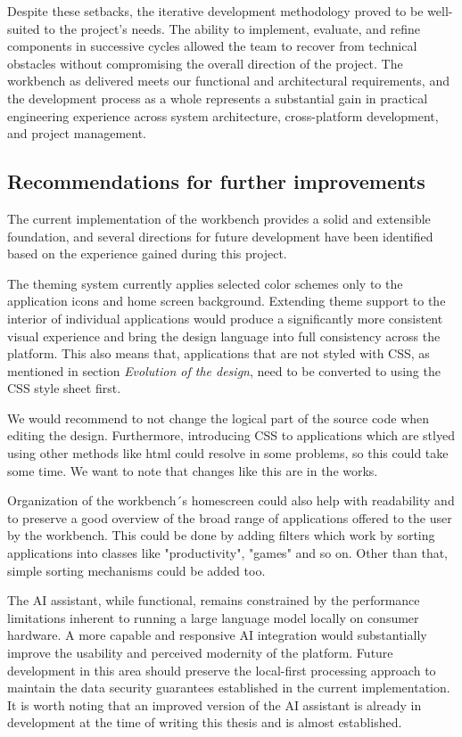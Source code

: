 \documentclass[a4paper,12pt]{article}
\begin{document}
Despite these setbacks, the iterative development methodology proved to be well-suited to the project's needs. 
The ability to implement, evaluate, and refine components in successive cycles allowed the team to recover from technical obstacles without compromising the overall direction of the project. 
The workbench as delivered meets our functional and architectural requirements, and the development process as a whole represents a substantial gain in practical engineering experience across system architecture, cross-platform development, and project management.

\newpage
\subsection{Recommendations for further improvements}
The current implementation of the workbench provides a solid and extensible foundation, and several directions for future development have been identified based on the experience gained during this project.

The theming system currently applies selected color schemes only to the application icons and home screen background. 
Extending theme support to the interior of individual applications would produce a significantly more consistent visual experience and bring the design language into full consistency across the platform.
This also means that, applications that are not styled with CSS, as mentioned in section \textit{Evolution of the design}, need to be converted to using the CSS style sheet first. 

\begin{notebox}
We would recommend to not change the logical part of the source code when editing the design. 
Furthermore, introducing CSS to applications which are stlyed using other methods like html could resolve in some problems, so this could take some time. 
We want to note that changes like this are in the works.   
\end{notebox}

Organization of the workbench´s homescreen could also help with readability and to preserve a good overview of the broad range of applications offered to the user by the workbench. 
This could be done by adding filters which work by sorting applications into classes like "productivity", "games" and so on. 
Other than that, simple sorting mechanisms could be added too. 

The AI assistant, while functional, remains constrained by the performance limitations inherent to running a large language model locally on consumer hardware. 
A more capable and responsive AI integration would substantially improve the usability and perceived modernity of the platform. 
Future development in this area should preserve the local-first processing approach to maintain the data security guarantees established in the current implementation. 
It is worth noting that an improved version of the AI assistant is already in development at the time of writing this thesis and is almost established.
\end{document}
